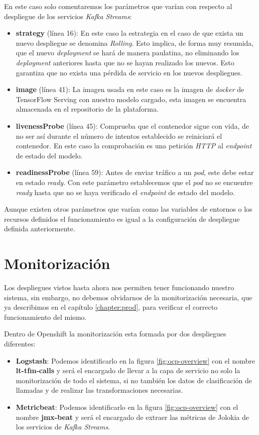 En este caso solo comentaremos los parámetros que varían con respecto al despliegue de los servicios \textit{Kafka Streams}: 
\begin{itemize}
	\item \textbf{strategy} (línea 16): En este caso la estrategia en el caso de que exista un nuevo despliegue se denomina \textit{Rolling}. Esto implica, de forma muy resumida, que el nuevo \textit{deployment} se hará de manera paulatina, no eliminando los \textit{deployment} anteriores hasta que no se hayan realizado los nuevos. Esto garantiza que no exista una pérdida de servicio en los nuevos despliegues.  
	\item \textbf{image} (línea 41): La imagen usada en este caso es la imagen de \textit{docker} de TensorFlow Serving con nuestro modelo cargado, esta imagen  se encuentra almacenada en el repositorio de la plataforma.
	\item \textbf{livenessProbe} (línea 45): Comprueba que el contenedor sigue con vida, de no ser así durante el número de intentos establecido se reiniciará el contenedor. En este caso la comprobación es una petición \textit{HTTP} al \textit{endpoint} de estado del modelo.
	 \item \textbf{readinessProbe} (línea 59): Antes de enviar tráfico a un \textit{pod}, este debe estar en estado \textit{ready}. Con este parámetro establecemos que el \textit{pod} no se encuentre \textit{ready} hasta que no se haya verificado el \textit{endpoint} de estado del modelo.
\end{itemize}

Aunque existen otros parámetros que varían como las variables de entornos o los recursos definidos el funcionamiento es igual a la configuración de despliegue definida anteriormente.


\section{Monitorización}

Los despliegues vistos hasta ahora nos permiten tener funcionando nuestro sistema, sin embargo, no debemos olvidarnos de la monitorización necesaria, que ya describimos en el capítulo \ref{chapter:prod}, para verificar el correcto funcionamiento del mismo. 

Dentro de Openshift la monitorización esta formada por dos despliegues diferentes:

\begin{itemize}
\item \textbf{Logstash}: Podemos identificarlo en la figura \ref{fig:ocp-overview} con el nombre \textbf{lt-tfm-calls} y será el encargado de llevar a la capa de servicio no solo la monitorización de todo el sistema, si no también los datos de clasificación de llamadas y  de realizar las transformaciones necesarias. 

\item \textbf{Metricbeat}: Podemos identificarlo en la figura \ref{fig:ocp-overview} con el nombre \textbf{jmx-beat} y será el encargado de extraer las métricas de Jolokia de los servicios de \textit{Kafka Streams}. 
\end{itemize}

